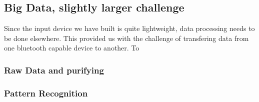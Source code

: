 \subsection{Big Data, slightly larger challenge}
Since the input device we have built is quite lightweight, data processing needs to be done elsewhere.
This provided us with the challenge of transfering data from one bluetooth capable device to another.
To 

\subsubsection{Raw Data and purifying}


\subsubsection{Pattern Recognition}